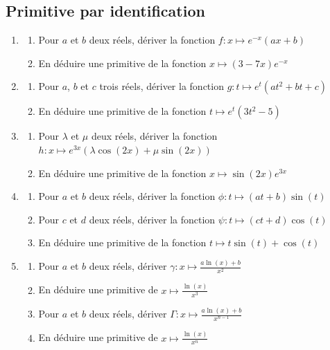 \documentclass[oneside,12pt]{article}          %
\begin{document}
\subsection{Primitive par identification}
\begin{enumerate}
	\item\begin{enumerate}
		\item Pour $a$ et $b$ deux réels, dériver la fonction $f:x\mapsto e^{-x}(ax+b)$
		\item En déduire une primitive de la fonction $x\mapsto(3-7x)e^{-x}$\\
	\end{enumerate}
	
	\item\begin{enumerate}
		\item Pour $a$, $b$ et $c$ trois réels, dériver la fonction $g:t\mapsto e^t\left(at^2+bt+c\right)$
		\item En déduire une primitive de la fonction $t\mapsto e^t\left(3t^2-5\right)$\\
	\end{enumerate}
	
	\item\begin{enumerate}
		\item Pour $\lambda$ et $\mu$ deux réels, dériver la fonction $h:x\mapsto e^{3x}\left(\lambda\cos(2x)+\mu\sin(2x)\right)$
		\item En déduire une primitive de la fonction $x\mapsto \sin(2x)e^{3x}$\\
	\end{enumerate}
	
	\item\begin{enumerate}
		\item Pour $a$ et $b$ deux réels, dériver la fonction $\phi:t\mapsto(at+b)\sin(t)$
		\item Pour $c$ et $d$ deux réels, dériver la fonction $\psi:t\mapsto(ct+d)\cos(t)$
		\item En déduire une primitive de la fonction $t\mapsto t\sin(t)+\cos(t)$\\
	\end{enumerate}
	
	\item\begin{enumerate}
		\item Pour $a$ et $b$ deux réels, dériver $\gamma:x\mapsto \frac{a\ln(x)+b}{x^2}$
		\item En déduire une primitive de $x\mapsto\frac{\ln(x)}{x^3}$
		\item Pour $a$ et $b$ deux réels, dériver $\Gamma:x\mapsto \frac{a\ln(x)+b}{x^{n-1}}$
		\item En déduire une primitive de $x\mapsto\frac{\ln(x)}{x^n}$
	\end{enumerate}
\end{enumerate}
\end{document}

